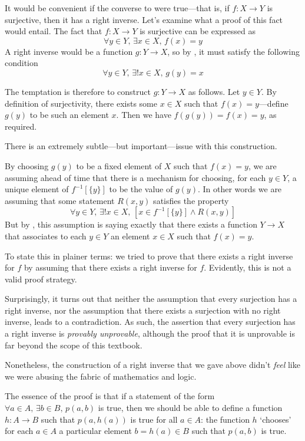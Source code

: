 It would be convenient if the converse to  were true---that is, if $f : X \to Y$ is surjective, then it has a right inverse. Let's examine what a proof of this fact would entail. The fact that $f : X \to Y$ is surjective can be expressed as
\[ \forall y \in Y,\, \exists x \in X,\, f(x) = y \]
A right inverse would be a function $g : Y \to X$, so by , it must satisfy the following condition
\[ \forall y \in Y,\, \exists ! x \in X,\, g(y) = x \]

The temptation is therefore to construct $g : Y \to X$ as follows. Let $y \in Y$. By definition of surjectivity, there exists some $x \in X$ such that $f(x) = y$---define $g(y)$ to be such an element $x$. Then we have $f(g(y)) = f(x) = y$, as required.

There is an extremely subtle---but important---issue with this construction.

By choosing $g(y)$ to be a fixed element of $X$ such that $f(x) = y$, we are assuming ahead of time that there is a mechanism for choosing, for each $y \in Y$, a unique element of $f^{-1}[\{y\}]$ to be the value of $g(y)$. In other words we are assuming that some statement $R(x,y)$ satisfies the property
\[ \forall y \in Y,\, \exists ! x \in X,\, [x \in f^{-1}[\{y\}] \wedge R(x,y)] \]
But by , this assumption is saying exactly that there exists a function $Y \to X$ that associates to each $y \in Y$ an element $x \in X$ such that $f(x) = y$.

To state this in plainer terms: we tried to prove that there exists a right inverse for $f$ by assuming that there exists a right inverse for $f$. Evidently, this is not a valid proof strategy.

Surprisingly, it turns out that neither the assumption that every surjection has a right inverse, nor the assumption that there exists a surjection with no right inverse, leads to a contradiction. As such, the assertion that every surjection has a right inverse is \textit{provably unprovable}, although the proof that it is unprovable is far beyond the scope of this textbook.

Nonetheless, the construction of a right inverse that we gave above didn't \textit{feel} like we were abusing the fabric of mathematics and logic.

The essence of the proof is that if a statement of the form $\forall a \in A,\, \exists b \in B,\, p(a,b)$ is true, then we should be able to define a function $h : A \to B$ such that $p(a,h(a))$ is true for all $a \in A$: the function $h$ `chooses' for each $a \in A$ a particular element $b = h(a) \in B$ such that $p(a,b)$ is true.

